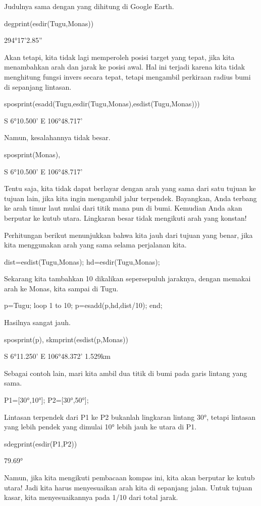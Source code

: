 \documentclass{article}
\begin{document}
Judulnya sama dengan yang dihitung di Google Earth.


\>degprint(esdir(Tugu,Monas))


    294°17'2.85''

Akan tetapi, kita tidak lagi memperoleh posisi target yang tepat, jika
kita menambahkan arah dan jarak ke posisi awal. Hal ini terjadi karena
kita tidak menghitung fungsi invers secara tepat, tetapi mengambil
perkiraan radius bumi di sepanjang lintasan.


\>sposprint(esadd(Tugu,esdir(Tugu,Monas),esdist(Tugu,Monas)))


    S 6°10.500' E 106°48.717'

Namun, kesalahannya tidak besar.


\>sposprint(Monas),


    S 6°10.500' E 106°48.717'

Tentu saja, kita tidak dapat berlayar dengan arah yang sama dari satu
tujuan ke tujuan lain, jika kita ingin mengambil jalur terpendek.
Bayangkan, Anda terbang ke arah timur laut mulai dari titik mana pun
di bumi. Kemudian Anda akan berputar ke kutub utara. Lingkaran besar
tidak mengikuti arah yang konstan!


Perhitungan berikut menunjukkan bahwa kita jauh dari tujuan yang
benar, jika kita menggunakan arah yang sama selama perjalanan kita.


\>dist=esdist(Tugu,Monas); hd=esdir(Tugu,Monas);


Sekarang kita tambahkan 10 dikalikan sepersepuluh jaraknya, dengan
memakai arah ke Monas, kita sampai di Tugu.


\>p=Tugu; loop 1 to 10; p=esadd(p,hd,dist/10); end;


Hasilnya sangat jauh.


\>sposprint(p), skmprint(esdist(p,Monas))


    S 6°11.250' E 106°48.372'
         1.529km

Sebagai contoh lain, mari kita ambil dua titik di bumi pada garis
lintang yang sama.


\>P1=[30°,10°]; P2=[30°,50°];


Lintasan terpendek dari P1 ke P2 bukanlah lingkaran lintang 30°,
tetapi lintasan yang lebih pendek yang dimulai 10° lebih jauh ke utara
di P1.


\>sdegprint(esdir(P1,P2))


         79.69°

Namun, jika kita mengikuti pembacaan kompas ini, kita akan berputar ke
kutub utara! Jadi kita harus menyesuaikan arah kita di sepanjang
jalan. Untuk tujuan kasar, kita menyesuaikannya pada 1/10 dari total
jarak.
\end{document}
